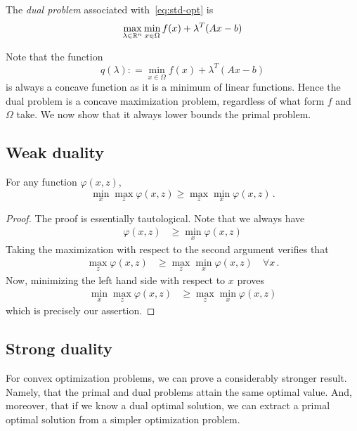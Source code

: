  The \emph{dual problem} associated with~\eqref{eq:std-opt} is
 \[
 \max_{\lambda \in \mathbb{R}^n} \min_{x \in \Omega} f(x) + \lambda^T(Ax-b)
\]

Note that the function
\[
	q(\lambda): =  \min_{x \in \Omega} f(x) + \lambda^T(Ax-b)
\]
is always a concave function as it is a minimum of linear functions.  Hence the dual problem is a concave maximization problem, regardless of what form $f$ and $\Omega$ take.  We now show that it always lower bounds the primal problem. 

\subsection{Weak duality}
  
\begin{proposition}
For any function $\varphi(x,z)$,
\[
 \min_x \max_z \varphi(x,z) \geq \max_z \min_x \varphi(x,z)\,.
 \]
\end{proposition}
\begin{proof}
The proof is essentially tautological.  Note that we always have
\begin{align*}
\varphi(x,z) &\geq \min_x \varphi(x,z)
\end{align*}
Taking the maximization with respect to the second argument verifies that
\begin{align*}
\max_z \varphi(x,z) &\geq \max_z \min_x \varphi(x,z) \quad \forall x\,.
\end{align*}
Now, minimizing the left hand side with respect to $x$ proves
\begin{align*}
\min_x \max_z\varphi(x,z) &\geq \max_z \min_x \varphi(x,z)
\end{align*}
which is precisely our assertion.
\end{proof}

\subsection{Strong duality}

For convex optimization problems, we can prove a considerably stronger result.  Namely, that the primal and dual problems attain the same optimal value.  And, moreover, that if we know a dual optimal solution, we can extract a primal optimal solution from a simpler optimization problem.


